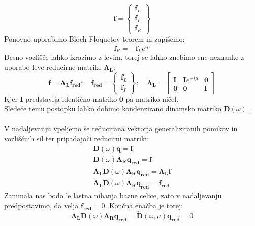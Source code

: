 \documentclass[12pt]{report}
\begin{document}
\begin{equation}
  \mathbf{f}=
    \begin{Bmatrix}
      \mathbf{f}_L \\
      \mathbf{f}_I \\
      \mathbf{f}_R
    \end{Bmatrix}
\end{equation}
Ponovno uporabimo Bloch-Floquetov teorem in zapišemo:
\begin{equation}
  \mathbf{f}_R = -\mathbf{f}_L e^{i\mu}
\end{equation}
Desno vozlišče lahko izrazimo z levim, torej se lahko znebimo ene neznanke z uporabo leve reducirne matrike $\mathbf{\Lambda_L}$:
\begin{equation}
  \mathbf{f}=\mathbf{\Lambda_L f_{red}}; \quad 
  \mathbf{f_{red}} = \begin{Bmatrix}
    \mathbf{f}_L \\
    \mathbf{f}_I
  \end{Bmatrix}; \quad
  \mathbf{\Lambda_L} = \begin{bmatrix}
    \mathbf{I} & \mathbf{I}e^{-i\mu} & \mathbf{0} \\
    \mathbf{0} & \mathbf{0} & \mathbf{I}
  \end{bmatrix}
\end{equation}
Kjer \textbf{I} predstavlja identično matriko \textbf{0} pa matriko ničel.\\
Sledeče temu postopku lahko dobimo kondenzirano dinamsko matriko $\mathbf{D}(\omega)$ \cite{kosir}. 
\\
\\
V nadaljevanju vpeljemo še reducirana vektorja generaliziranih pomikov in vozliščnih sil ter pripadajoči reducirni matriki:
\begin{equation*}
  \begin{aligned}
    \mathbf{D}(\omega)\mathbf{q}=\mathbf{f} \\
    \mathbf{D}(\omega)\mathbf{\Lambda_R q_{red}} = \mathbf{f} \\
    \mathbf{\Lambda_L} \mathbf{D}(\omega)\mathbf{\Lambda_R q_{red}} = \mathbf{\Lambda_L} \mathbf{f} \\
    \mathbf{\Lambda_L} \mathbf{D}(\omega)\mathbf{\Lambda_R q_{red}} = \mathbf{f_{red}}
  \end{aligned}
\end{equation*}
Zanimala nas bodo le lastna nihanja bazne celice, zato v nadaljevanju predpostavimo, da velja $\mathbf{f_{red}}=0$.
Končna enačba je torej:
\begin{equation}
  \mathbf{\Lambda_L} \mathbf{D}(\omega)\mathbf{\Lambda_R q_{red}} = \mathbf{\widetilde{D}}(\omega, \mu) \mathbf{q_{red}} = 0
\end{equation}
\end{document}
